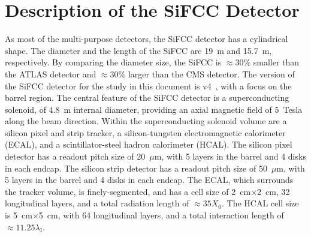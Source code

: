 \documentclass{PoS}
\begin{document}
\section{Description of the SiFCC Detector} 
As most of the multi-purpose detectors, the SiFCC detector has a 
cylindrical shape. The diameter and the length of the SiFCC are 19~m 
and 15.7~m, respectively. By comparing the diameter size, 
the SiFCC is $\approx 30\%$ smaller than the ATLAS detector and 
$\approx 30\%$ larger than the CMS detector. 
The version of the SiFCC detector for the study in this document 
is v4~\cite{SiFCCv4}, with a focus on the barrel region. 
%
The central feature of the SiFCC detector is a superconducting solenoid, 
of 4.8~m internal diameter, providing an axial magnetic field of 5~Tesla 
along the beam direction. Within the superconducting solenoid volume are 
a silicon pixel and strip tracker, a silicon-tungsten electromagnetic 
calorimeter (ECAL), and a scintillator-steel hadron calorimeter (HCAL). 
The silicon pixel detector has a readout pitch size of 20~$\mu$m, with
5 layers in the barrel and 4 disks in each endcap. 
The silicon strip detector has a readout pitch size of 50~$\mu$m, with 5 
layers in the barrel and 4 disks in each endcap.
 The ECAL, which surrounds the tracker volume, is finely-segmented, and 
 has a cell size of 2~cm$\times$2~cm, 32 longitudinal layers, and a 
total radiation length of $\approx 35 X_0$. The HCAL cell size is 
5~cm$\times$5~cm, with 64 longitudinal layers, and a total interaction 
length of $\approx 11.25 \lambda_{\mathrm I}$.

 
\end{document}
